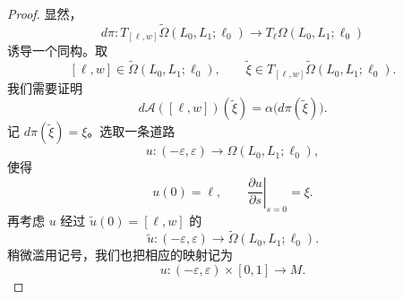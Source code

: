 \begin{proof}
显然，
\[
  d\pi:
  T_{[\ell,w]}\widetilde\Omega(L_0,L_1;\ell_0)
  \longrightarrow T_\ell\Omega(L_0,L_1;\ell_0)
\]
诱导一个同构。取
\[
  [\ell,w]\in\widetilde\Omega(L_0,L_1;\ell_0),
  \qquad
  \widetilde\xi
  \in T_{[\ell,w]}\widetilde\Omega(L_0,L_1;\ell_0).
\]
我们需要证明
\begin{equation}
  d\mathcal A([\ell,w])(\widetilde\xi)
  =\alpha\bigl(d\pi(\widetilde\xi)\bigr).
\label{eq:action-differential-tangent}
\end{equation}
记 $d\pi(\widetilde\xi)=\xi$。选取一条道路
\[
  u:(-\varepsilon,\varepsilon)
  \longrightarrow\Omega(L_0,L_1;\ell_0),
\]
使得
\begin{equation}
  u(0)=\ell,
  \qquad
  \left.\frac{\partial u}{\partial s}\right|_{s=0}=\xi.
\label{eq:path-variation-initial}
\end{equation}
再考虑 $u$ 经过
$\widetilde u(0)=[\ell,w]$ 的\termLocalLifting{}
\[
  \widetilde u:(-\varepsilon,\varepsilon)
  \longrightarrow\widetilde\Omega(L_0,L_1;\ell_0).
\]
稍微滥用记号，我们也把相应的映射记为
\[
  u:(-\varepsilon,\varepsilon)\times[0,1]\longrightarrow M.
\]


\end{proof}
